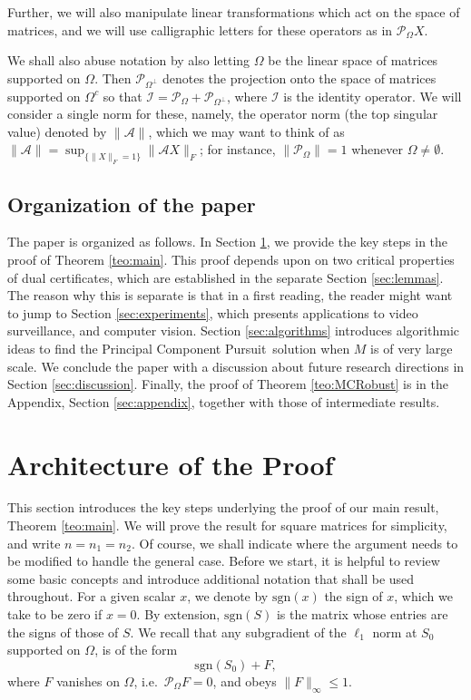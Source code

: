 Further, we will also manipulate linear transformations which act on the space of matrices, and we will use calligraphic letters for these operators as in $\mathcal{P}_{\Omega} X$. 

We shall also abuse notation by also letting $\Omega$ be the linear space of matrices supported on $\Omega$. Then $\mathcal{P}_{\Omega^\perp}$ denotes the projection onto the space of matrices supported on $\Omega^c$ so that
$\mathcal{I} = \mathcal{P}_{\Omega} + \mathcal{P}_{\Omega^\perp}$, where $\mathcal{I}$ is the identity operator. We will consider a single norm for these, namely, the operator norm (the top singular value) denoted by $\|\mathcal{A}\|$, which we may want to think of as $\|\mathcal{A}\| = \sup_{\{\|X\|_F = 1\}} \|\mathcal{A}
X\|_F$; for instance, $\|\mathcal{P}_{\Omega}\| = 1$ whenever $\Omega \neq \emptyset$.

\subsection{Organization of the paper}
\label{sec:organization}

The paper is organized as follows. In Section \ref{sec:architecture},
we provide the key steps in the proof of Theorem \ref{teo:main}. This proof depends upon on two critical properties of dual certificates, which are established in the separate Section \ref{sec:lemmas}. The reason why this is separate is that in a first reading, the reader might want to jump to Section \ref{sec:experiments}, which presents applications to video surveillance, and computer vision. Section
\ref{sec:algorithms} introduces algorithmic ideas to find the Principal Component Pursuit\, solution when $M$ is of very large scale. We conclude the paper with a discussion about future research directions in Section
\ref{sec:discussion}. Finally, the proof of Theorem \ref{teo:MCRobust}
is in the Appendix, Section \ref{sec:appendix}, together with those of intermediate results.

\section{Architecture of the Proof}
\label{sec:architecture}

This section introduces the key steps underlying the proof of our main result, Theorem \ref{teo:main}. We will prove the result for square matrices for simplicity, and write $n = n_1 = n_2$. Of course, we shall indicate where the argument needs to be modified to handle the general case.  Before we start, it is helpful to review some basic concepts and introduce additional notation that shall be used throughout.  For a given scalar $x$, we denote by $\textrm{sgn}(x)$ the sign of $x$, which we take to be zero if $x = 0$. By extension, $\textrm{sgn}(S)$
is the matrix whose entries are the signs of those of $S$.  We recall that any subgradient of the $\ell_1$ norm at $S_0$ supported on
$\Omega$, is of the form
\[
\textrm{sgn}(S_0) + F, 
\]
where $F$ vanishes on $\Omega$, i.e.~$\mathcal{P}_{\Omega} F = 0$, and obeys
$\|F\|_\infty \le 1$.

